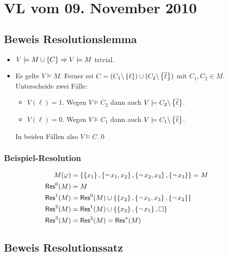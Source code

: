 \section{VL vom 09. November 2010}

\subsection{Beweis Resolutionslemma}

\begin{itemize}
  \item $V \models  M \cup \left\{C\right\} \Rightarrow V \models  M$ trivial.
  \item Es gelte $V\models M$. Ferner sei $C=(C_1\backslash \left\{\ell\right\}) \cup
  (C_2\backslash \left\{\overline{\ell}\right\})$ mit $C_1,C_2 \in M$. Unterscheide zwei
  Fälle:
  \begin{itemize}
    \item $V(\ell) = 1$. Wegen $V\models C_2$ dann auch $V\models C_2\backslash \left\{\overline{\ell}\right\}$.
    \item $V(\ell) = 0$. Wegen $V\models C_1$ dann auch $V\models C_1\backslash \left\{\overline{\ell}\right\}$.
  \end{itemize}
  In beiden Fällen also $V\models C$.\qed
\end{itemize}

\subsubsection{Beispiel-Resolution}

\begin{align}
  M(\varphi) &= \left\{\left\{x_1\right\}, \left\{\operatorname{\neg} x_1, x_2\right\}, \left\{\operatorname{\neg} x_2, x_3\right\}, \left\{\operatorname{\neg} x_3\right\}\right\} = M \\
  \operatorname{\text{\textsf{Res}}}^0(M)   &= M \\
  \operatorname{\text{\textsf{Res}}}^1(M)   &= \operatorname{\text{\textsf{Res}}}^0(M) \cup \left\{\left\{x_2\right\}, \left\{\operatorname{\neg} x_1, x_3\right\}, \left\{\operatorname{\neg} x_2\right\}\right\} \\
  \operatorname{\text{\textsf{Res}}}^2(M)   &= \operatorname{\text{\textsf{Res}}}^1(M) \cup \left\{\left\{x_3\right\}, \left\{\operatorname{\neg} x_1\right\}, \square\right\} \\
  \operatorname{\text{\textsf{Res}}}^3(M)   &= \operatorname{\text{\textsf{Res}}}^2(M) = \operatorname{\text{\textsf{Res}}}^*(M)
\end{align}

\subsection{Beweis Resolutionssatz}

